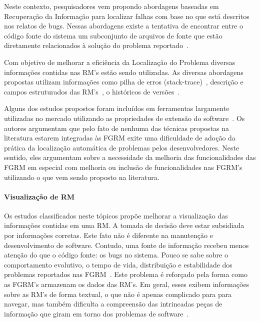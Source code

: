 Neste contexto, pesquisadores vem propondo abordagens baseadas em
Recuperação da Informação para localizar falhas com base no que está descritos
nos relatos de bugs. Nessas abordagens existe a tentativa de encontrar entre
o código fonte do sistema um subconjunto de arquivos de fonte que
estão diretamente relacionados à solução do problema
reportado~\cite{Wong:2014:BBF:2705615.2706096}.

Com objetivo de melhorar a eficiência da Localização do Problema diversas
informações contidas nas RM's estão sendo utilizadas. As diversas abordagens
propostas utilizam informações como pilha de erros
(stack-trace)~\cite{Wong:2014:BBF:2705615.2706096}, descrição e campos
estruturados das RM's~\cite{Thung:2014:BIT:2635868.2661678}, o históricos de
versões~\cite{Bangcharoensap:2012:LSC:2419061.2419428,corley2011recovering,Romo:2015:TAT:2745802.2745833}.

Alguns dos estudos propostos foram incluídos em ferramentas largamente
utilizadas no mercado utilizando as propriedades de extensão do
software~\cite{Thung:2014:BIT:2635868.2661678,corley2011recovering}. Os autores
argumentam que pelo fato de nenhuma das técnicas propostas na literatura
estarem integradas às FGRM exite uma dificuldade de adoção da prática da
localização automática de problemas pelos desenvolvedores. Neste sentido, eles
argumentam sobre a necessidade da melhoria das funcionalidades das FGRM em
especial com melhoria ou inclusão de funcionalidades nas FGRM's utilizando o que
vem sendo proposto na literatura.

\paragraph{Visualização de RM}
Os estudos classificados neste tópicos propõe melhorar a visualização das
informações contidas em uma RM\@. A tomada de decisão deve estar subsidiada por
informações corretas. Este fato não é diferente na manutenção e desenvolvimento
de software. Contudo, uma fonte de informação recebeu menos atenção do que o
código fonte: os bugs no sistema. Pouco se sabe sobre o comportamento evolutivo,
o tempo de vida, distribuição e estabilidade dos problemas reportados nas
FGRM~\cite{hora2012bug}. Este problema é reforçado pela forma como as FGRM's
armazenam os dados das RM's. Em geral, esses exibem informações sobre as RM's de
forma textual, o que não é apenas complicado para para navegar, mas também
dificulta a compreensão das intrincadas peças de informação que giram em torno
dos problemas de software~\cite{dal2014bug}.


